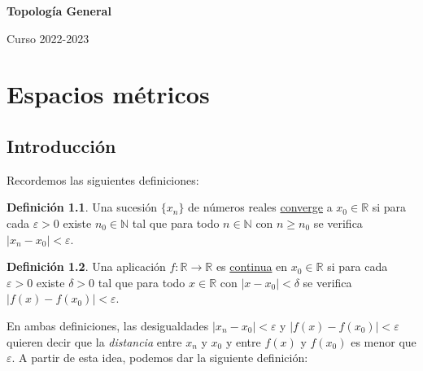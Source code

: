 \documentclass[12pt]{report}
\theoremstyle{definition}
\newtheorem{definition}{Definición}[chapter]
\theoremstyle{definition}
\theoremstyle{remark}
\newcommand{\R}{\mathbb R}
\newcommand{\N}{\mathbb N}
\begin{document}
\setlength{\abovedisplayskip}{5pt}
\setlength{\belowdisplayskip}{5pt}

\thispagestyle{empty} %

\begin{center}
    \vspace*{1cm} %
    \Huge \textbf{Topología General}
        
    \vspace{10mm} %
    \large
        
    Curso 2022-2023
\end{center}

\tableofcontents

\thispagestyle{empty}

\chapter{Espacios métricos}

\section{Introducción}

Recordemos las siguientes definiciones:

\begin{definition}
Una sucesión $\{x_n\}$ de números reales \underline{converge} a $x_0 \in \R$ si para cada $\varepsilon > 0$ existe $n_0 \in \N$ tal que para todo $n \in \N$ con $n \geq n_0$ se verifica $|x_n - x_0| < \varepsilon$.
\end{definition}

\begin{definition}
Una aplicación $f \colon \R \to \R$ es \underline{continua} en $x_0 \in \R$ si para cada $\varepsilon > 0$ existe $\delta > 0$ tal que para todo $x \in \R$ con $|x - x_0| < \delta$ se verifica $|f(x) - f(x_0)| < \varepsilon$.
\end{definition}

\vspace{2mm}
En ambas definiciones, las desigualdades $|x_n - x_0| < \varepsilon$ y $|f(x) - f(x_0)| < \varepsilon$ quieren decir que la \textit{distancia} entre $x_n$ y $x_0$ y entre $f(x)$ y $f(x_0)$ es menor que $\varepsilon$. A partir de esta idea, podemos dar la siguiente definición:
\end{document}
